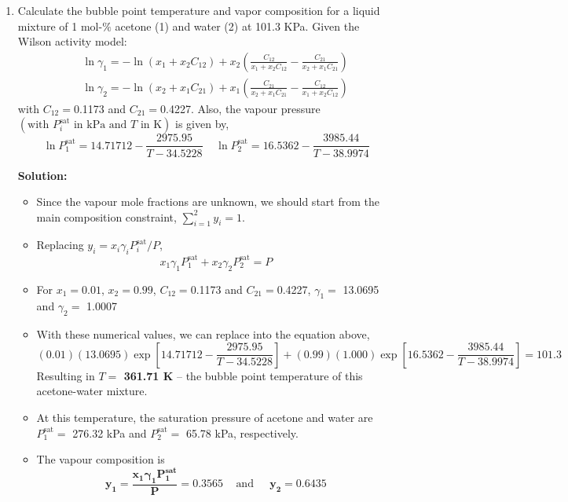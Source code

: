 \documentclass[12pts,a4paper,amsmath,amssymb,floatfix]{article}%
\newcommand{\frc}{\displaystyle\frac}
\begin{document}
\begin{enumerate}[label=\bfseries Example \arabic*]
\item\label{Example:2} Calculate the bubble point temperature and vapor composition for a liquid mixture of 1 mol-$\%$ acetone (1) and water (2) at 101.3 KPa. Given the Wilson activity model:
   \begin{eqnarray}
       &&\ln\gamma_{1} = -\ln\left(x_{1}+x_{2}C_{12}\right) + x_{2}\left(\frc{C_{12}}{x_{1}+x_{2}C_{12}}-\frc{C_{21}}{x_{2}+x_{1}C_{21}}\right) \nonumber \\
       &&\ln\gamma_{2} = -\ln\left(x_{2}+x_{1}C_{21}\right) + x_{1}\left(\frc{C_{21}}{x_{2}+x_{1}C_{21}}-\frc{C_{12}}{x_{1}+x_{2}C_{12}}\right) \nonumber
   \end{eqnarray}
   with $C_{12}=$0.1173 and $C_{21}=$0.4227. Also, the vapour pressure $\left(\text{with } P_{i}^{\text{sat}}\text{ in kPa and } T\text{ in K}\right)$ is given by,
\begin{displaymath}
   \ln P_{1}^{\text{sat}} = 14.71712 - \frc{2975.95}{T-34.5228} \;\;\;\; \ln P_{2}^{\text{sat}} = 16.5362 - \frc{3985.44}{T-38.9974}
\end{displaymath}


\bigskip

{\large{\bf Solution:}}

   \begin{itemize}
      \item Since the vapour mole fractions are unknown, we should start from the main composition constraint, $\sum\limits_{i=1}^{2}y_{i} = 1$.  
      \item Replacing $y_{i}=x_{i}\gamma_{i}P_{i}^{\text{sat}}/P$,
         \begin{displaymath}
            x_{1}\gamma_{1}P_{1}^{\text{sat}} + x_{2}\gamma_{2}P_{2}^{\text{sat}} = P
         \end{displaymath}
      \item For $x_{1} = 0.01$, $x_{2}=0.99$, $C_{12}=$0.1173 and $C_{21}=$0.4227, $\gamma_{1}=$ 13.0695 and $\gamma_{2}=$ 1.0007
      \item With these numerical values, we can replace into the equation above,
         \begin{displaymath}
            (0.01)(13.0695)\exp\left[14.71712 - \frc{2975.95}{T-34.5228}\right] + (0.99)(1.000)\exp\left[16.5362 - \frc{3985.44}{T-38.9974}\right] =  101.3
         \end{displaymath}
         Resulting in {\bf $T=$ 361.71 K} -- the bubble point temperature of this acetone-water mixture.
      \item At this temperature, the saturation pressure of acetone and water are $P_{1}^{\text{sat}}=$ 276.32 kPa and $P_{2}^{\text{sat}}=$ 65.78 kPa, respectively.
      \item The vapour composition is
         \begin{displaymath}
             \mathbf{y_{1} =\frc{x_{1}\gamma_{1}P_{1}^{\text{sat}}}{P} = 0.3565}\;\;\;\text{ and }\;\;\;\; \mathbf{y_{2} = 0.6435}
         \end{displaymath} 
   \end{itemize}
\clearpage


\end{enumerate}
\end{document}

